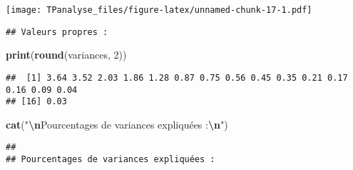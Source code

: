\documentclass[
]{article}
\newenvironment{Shaded}{\begin{snugshade}}{\end{snugshade}}
\newcommand{\CommentTok}[1]{\textcolor[rgb]{0.56,0.35,0.01}{\textit{#1}}}
\newcommand{\DecValTok}[1]{\textcolor[rgb]{0.00,0.00,0.81}{#1}}
\newcommand{\FunctionTok}[1]{\textcolor[rgb]{0.13,0.29,0.53}{\textbf{#1}}}
\newcommand{\NormalTok}[1]{#1}
\newcommand{\OtherTok}[1]{\textcolor[rgb]{0.56,0.35,0.01}{#1}}
\newcommand{\SpecialCharTok}[1]{\textcolor[rgb]{0.81,0.36,0.00}{\textbf{#1}}}
\newcommand{\StringTok}[1]{\textcolor[rgb]{0.31,0.60,0.02}{#1}}
\begin{document}
\texttt{[image: TPanalyse\_files/figure-latex/unnamed-chunk-17-1.pdf]}

\begin{Shaded}
\end{Shaded}

\begin{verbatim}
## Valeurs propres :
\end{verbatim}

\begin{Shaded}
\begin{Highlighting}[]
\FunctionTok{print}\NormalTok{(}\FunctionTok{round}\NormalTok{(variances, }\DecValTok{2}\NormalTok{))}
\end{Highlighting}
\end{Shaded}

\begin{verbatim}
##  [1] 3.64 3.52 2.03 1.86 1.28 0.87 0.75 0.56 0.45 0.35 0.21 0.17 0.16 0.09 0.04
## [16] 0.03
\end{verbatim}

\begin{Shaded}
\begin{Highlighting}[]
\FunctionTok{cat}\NormalTok{(}\StringTok{"}\SpecialCharTok{\textbackslash{}n}\StringTok{Pourcentages de variances expliquées :}\SpecialCharTok{\textbackslash{}n}\StringTok{"}\NormalTok{)}
\end{Highlighting}
\end{Shaded}

\begin{verbatim}
## 
## Pourcentages de variances expliquées :
\end{verbatim}
\end{document}
